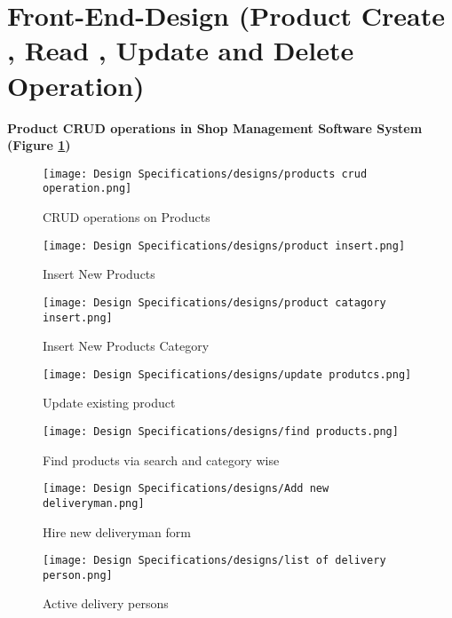 \section{Front-End-Design (Product Create , Read , Update and Delete Operation)}
\vspace{0.2cm}
\textbf{Product CRUD operations in Shop Management Software System (Figure \ref{fig:fig 5.17})}\\

\begin{figure}[ht]
    \centering  
    \texttt{[image: Design Specifications/designs/products crud operation.png]}    
    \caption{CRUD operations on Products}
    \label{fig:fig 5.17}
\end{figure}
\begin{figure}[ht]
    \centering  
    \texttt{[image: Design Specifications/designs/product insert.png]}    
    \caption{Insert New Products}
    \label{fig:fig 5.18}
\end{figure}
\begin{figure}[ht]
    \centering  
    \texttt{[image: Design Specifications/designs/product catagory insert.png]}    
    \caption{Insert New Products Category}
    \label{fig:fig 5.19}
\end{figure}
\begin{figure}[ht]
    \centering  
    \texttt{[image: Design Specifications/designs/update produtcs.png]}    
    \caption{Update existing product}
    \label{fig:fig 5.20}
\end{figure}
\begin{figure}[ht]
    \centering  
    \texttt{[image: Design Specifications/designs/find products.png]}    
    \caption{Find products via search and category wise}
    \label{fig:fig 5.21}
\end{figure}
\begin{figure}[ht]
    \centering  
    \texttt{[image: Design Specifications/designs/Add new deliveryman.png]}    
    \caption{Hire new deliveryman form}
    \label{fig:fig 5.22}
\end{figure}
\begin{figure}[ht]
    \centering  
    \texttt{[image: Design Specifications/designs/list of delivery person.png]}    
    \caption{Active delivery persons}
    \label{fig:fig 5.23}
\end{figure}
